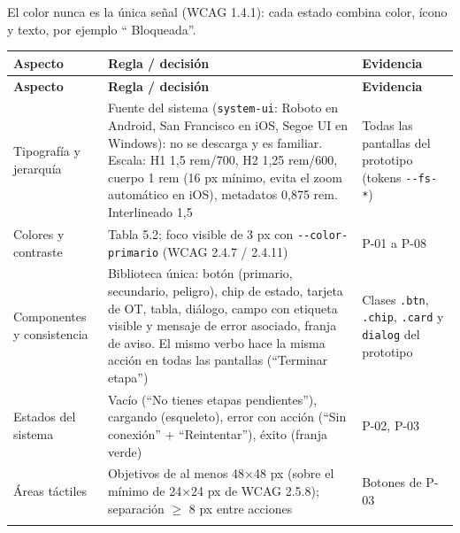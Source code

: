 \documentclass[11pt,a4paper]{article}
\newcommand{\warnsign}{\tikz[baseline=0ex]{\draw[line join=round] (0,0) -- (1.1ex,0) -- (0.55ex,1ex) -- cycle; \node[inner sep=0pt, font=\tiny\bfseries] at (0.55ex,0.38ex) {!};}}
\begin{document}
El color nunca es la única señal (WCAG 1.4.1): cada estado combina color, ícono y texto, por ejemplo ``\warnsign{} Bloqueada''.

\begingroup
\begin{longtable}{@{}>{\raggedright\arraybackslash\hspace{0pt}}p{}>{\raggedright\arraybackslash\hspace{0pt}}p{}>{\raggedright\arraybackslash\hspace{0pt}}p{}@{}}
\toprule
\textbf{Aspecto} & \textbf{Regla / decisión} & \textbf{Evidencia} \\ \midrule
\endfirsthead
\toprule
\textbf{Aspecto} & \textbf{Regla / decisión} & \textbf{Evidencia} \\ \midrule
\endhead
\bottomrule
\endlastfoot
Tipografía y jerarquía & Fuente del sistema (\texttt{system-{}\allowbreak{}ui}: Roboto en Android, San Francisco en iOS, Segoe UI en Windows): no se descarga y es familiar. Escala: H1 1,5 rem/700, H2 1,25 rem/600, cuerpo 1 rem (16 px mínimo, evita el zoom automático en iOS), metadatos 0,875 rem. Interlineado 1,5 & Todas las pantallas del prototipo (tokens \texttt{-{}\allowbreak{}-{}\allowbreak{}fs-{}\allowbreak{}*}) \\ \addlinespace[0.25em]
Colores y contraste & Tabla 5.2; foco visible de 3 px con \texttt{-{}\allowbreak{}-{}\allowbreak{}color-{}\allowbreak{}primario} (WCAG 2.4.7 / 2.4.11) & \mbox{P-01} a \mbox{P-08} \\ \addlinespace[0.25em]
Componentes y consistencia & Biblioteca única: botón (primario, secundario, peligro), chip de estado, tarjeta de OT, tabla, diálogo, campo con etiqueta visible y mensaje de error asociado, franja de aviso. El mismo verbo hace la misma acción en todas las pantallas (``Terminar etapa'') & Clases \texttt{.\allowbreak{}btn}, \texttt{.\allowbreak{}chip}, \texttt{.\allowbreak{}card} y \texttt{dialog} del prototipo \\ \addlinespace[0.25em]
Estados del sistema & Vacío (``No tienes etapas pendientes''), cargando (esqueleto), error con acción (``Sin conexión'' + ``Reintentar''), éxito (franja verde) & \mbox{P-02}, \mbox{P-03} \\ \addlinespace[0.25em]
Áreas táctiles & Objetivos de al menos 48\ensuremath{\times}48 px (sobre el mínimo de 24\ensuremath{\times}24 px de WCAG 2.5.8); separación \ensuremath{\geq} 8 px entre acciones & Botones de \mbox{P-03} \\ \addlinespace[0.25em]

\end{longtable}
\end{document}
